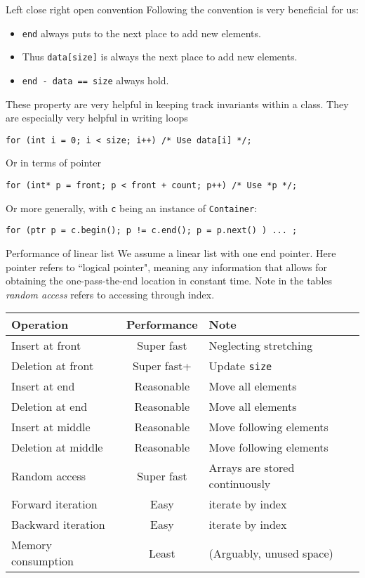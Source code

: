 \begin{frame}[fragile]{Left close right open convention}
Following the convention is very beneficial for us:
\begin{itemize}
	\item \texttt{end} always puts to the next place to add new elements.
	\item Thus \texttt{data[size]} is always the next place to add new elements.
	\item \texttt{end - data == size} always hold.
\end{itemize}

These property are very helpful in keeping track invariants within a class. They are especially very helpful in writing loops
\begin{verbatim}
for (int i = 0; i < size; i++) /* Use data[i] */;
\end{verbatim}
Or in terms of pointer
\begin{verbatim}
for (int* p = front; p < front + count; p++) /* Use *p */;
\end{verbatim}
Or more generally, with \texttt{c} being an instance of \texttt{Container}:
\begin{verbatim}
for (ptr p = c.begin(); p != c.end(); p = p.next() ) ... ;
\end{verbatim}
\end{frame}

\begin{frame}{Performance of linear list}
We assume a linear list with one end pointer. Here pointer refers to ``logical pointer", meaning any information that allows for obtaining the one-pass-the-end location in constant time. Note in the tables \textit{random access} refers to accessing through index.

\vspace{-.2in}
\begin{table}
	\begin{tabular}{l | c | l }
		Operation & Performance & Note \\
		\hline \hline
		Insert at front & Super fast  & Neglecting stretching\\ 
		Deletion at front & Super fast+ & Update \texttt{size}\\
		Insert at end & Reasonable & Move all elements\\
		Deletion at end & Reasonable & Move all elements\\
		Insert at middle & Reasonable & Move following elements\\
		Deletion at middle & Reasonable & Move following elements\\
		Random access & Super fast & Arrays are stored continuously\\
		Forward iteration & Easy & iterate by index\\
		Backward iteration & Easy & iterate by index\\
		Memory consumption & Least & (Arguably, unused space) \\
	\end{tabular}
\end{table}
\end{frame}


